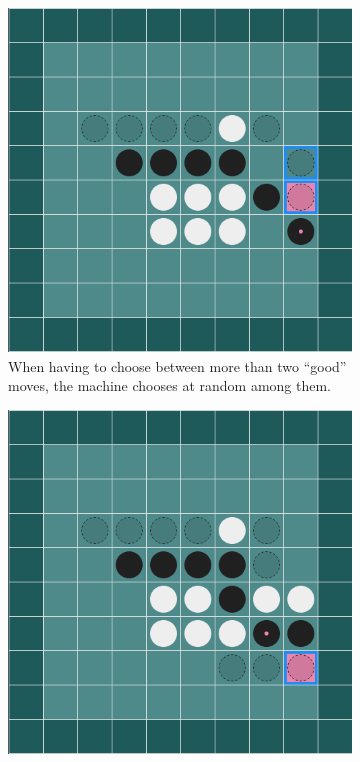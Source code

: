 \documentclass[a4paper,11pt]{article}
\theoremstyle{definition}
\theoremstyle{remark}
\numberwithin{equation}{section}
\begin{document}
	\begin{figure}[!htb]
		\centering
		\begin{subfigure}[t]{0.48\textwidth}
			\centering
			\includegraphics[width = \textwidth]{../assets/coaching_success_001.png}
			\caption{When having to choose between more than two ``good'' moves, the machine chooses at random among them.}
			\label{fig:201a}
		\end{subfigure}\hfill
		\begin{subfigure}[t]{0.48\textwidth}
			\centering
			\includegraphics[width = \textwidth]{../assets/coaching_failure_001.png}

\end{subfigure}
\end{figure}
\end{document}
